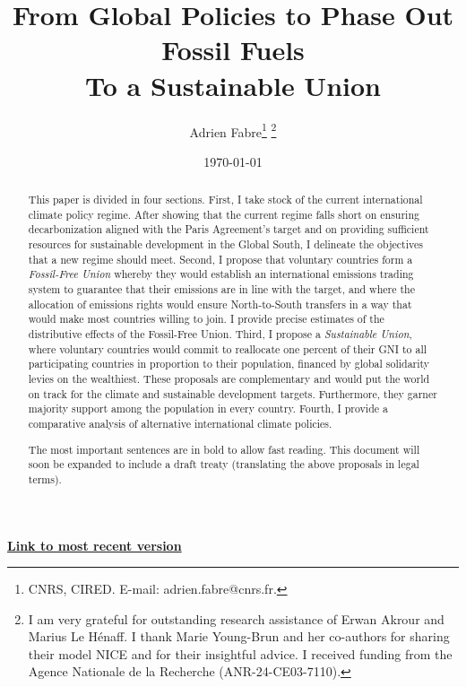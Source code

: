 \documentclass[12pt,english]{article}
\title{From Global Policies to Phase Out Fossil Fuels\\To a Sustainable Union}
\author{Adrien Fabre\footnote{CNRS, CIRED. E-mail: adrien.fabre@cnrs.fr.} \footnote{I am very grateful for outstanding research assistance of Erwan Akrour and Marius Le Hénaff. I thank Marie Young-Brun and her co-authors for sharing their model NICE and for their insightful advice. I received funding from the Agence Nationale de la Recherche (ANR-24-CE03-7110).}}
\date{\today} %
\newcommand{\bo}[1]{\textbf{#1}}
\begin{document}
\sloppy
\maketitle

\begin{center}
{\bo{\href{https://github.com/bixiou/global_tax_attitudes/raw/main/paper/global_climate_policies.pdf}{Link to most recent version}}}
\end{center}


\begin{abstract}

This paper is divided in four sections. First, I take stock of the current international climate policy regime. After showing that the current regime falls short on ensuring decarbonization aligned with the Paris Agreement's target and on providing sufficient resources for sustainable development in the Global South, I delineate the objectives that a new regime should meet. Second, I propose that voluntary countries form a \textit{Fossil-Free Union} whereby they would establish an international emissions trading system to guarantee that their emissions are in line with the target, and where the allocation of emissions rights would ensure North-to-South transfers in a way that would make most countries willing to join. I provide precise estimates of the distributive effects of the Fossil-Free Union. Third, I propose a \textit{Sustainable Union}, where voluntary countries would commit to reallocate one percent of their GNI to all participating countries in proportion to their population, financed by global solidarity levies on the wealthiest. These proposals are complementary and would put the world on track for the climate and sustainable development targets. Furthermore, they garner majority support among the population in every country. Fourth, I provide a comparative analysis of alternative international climate policies.

The most important sentences are in bold to allow fast reading. This document will soon be expanded to include a draft treaty (translating the above proposals in legal terms).

\end{abstract}
\end{document}
